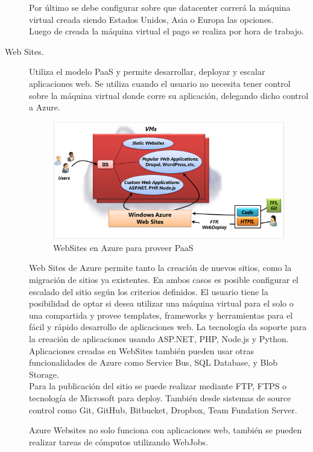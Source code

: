 \begin{description}
\begin{itemize}
\end {itemize}
Por último se debe configurar sobre que datacenter correrá la máquina virtual creada siendo Estados Unidos, Asia o Europa las opciones.\\
Luego de creada la máquina virtual el pago se realiza por hora de trabajo.

\item [Web Sites.] Utiliza el modelo PaaS y permite desarrollar, deployar y escalar aplicaciones web. Se utiliza cuando el usuario no necesita tener control sobre la máquina virtual donde corre su aplicación, delegando dicho control a Azure.

\begin{figure}[h!]
    \centering
    \includegraphics[width=\columnwidth, keepaspectratio]{_imagenes/azure_websites}
    \caption{WebSites en Azure para proveer PaaS} \label{fig:azure_websites}
\end{figure}

Web Sites de Azure permite tanto la creación de nuevos sitios, como la migración de sitios ya existentes. En ambos casos es posible configurar el escalado del sitio según los criterios definidos.
El usuario tiene la posibilidad de optar si desea utilizar una máquina virtual para el solo o una compartida y provee templates, frameworks y herramientas para el fácil y rápido desarrollo de aplicaciones web. La tecnología da soporte para la creación de aplicaciones usando ASP.NET, PHP, Node.js y Python.
Aplicaciones creadas en WebSites también pueden usar otras funcionalidades de Azure como Service Bus, SQL Database, y Blob Storage.\\
Para la publicación del sitio se puede realizar mediante FTP, FTPS o tecnología de Microsoft para deploy. También desde sistemas de source control como Git, GitHub, Bitbucket, Dropbox, Team Fundation Server.

Azure Websites no solo funciona con aplicaciones web, también se pueden realizar tareas de cómputos utilizando WebJobs.



\end{description}
